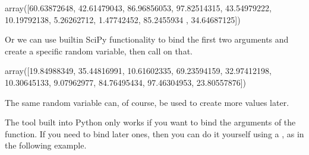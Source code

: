 \documentclass[letterpaper,10pt,english]{sphinxmanual}
\begin{document}
\begin{sphinxVerbatim}[commandchars=\\\{\}]
   
    
\end{sphinxVerbatim}

\begin{sphinxVerbatim}[commandchars=\\\{\}]
array([60.63872648, 42.61479043, 86.96856053, 97.82514315, 43.54979222,
       10.19792138,  5.26262712,  1.47742452, 85.2455934 , 34.64687125])
\end{sphinxVerbatim}

Or we can use built\sphinxhyphen{}in SciPy functionality to bind the first two arguments and create a specific random variable, then call  on that.

\begin{sphinxVerbatim}[commandchars=\\\{\}]
       
               
\end{sphinxVerbatim}

\begin{sphinxVerbatim}[commandchars=\\\{\}]
array([19.84988349, 35.44816991, 10.61602335, 69.23594159, 32.97412198,
       10.30645133,  9.07962977, 84.76495434, 97.46304953, 23.80557876])
\end{sphinxVerbatim}

The same random variable can, of course, be used to create more values later.

The  tool built into Python only works if you want to bind the  arguments of the function.  If you need to bind later ones, then you can do it yourself using a , as in the following example.

\begin{sphinxVerbatim}[commandchars=\\\{\}]
        
       

         

  
\end{sphinxVerbatim}
\end{document}
